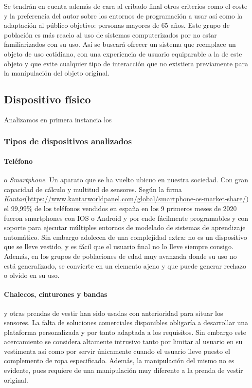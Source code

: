 Se tendrán en cuenta además de cara al cribado final otros criterios como el coste y la preferencia del autor sobre los entornos de programación a usar así como la adaptación al público objetivo: personas mayores de 65 años. Este grupo de población es más reacio al uso de sistemas computerizados por no estar familiarizados con su uso. Así se buscará ofrecer un sistema que reemplace un objeto de uso cotidiano, con una experiencia de usuario equiparable a la de este objeto y que evite cualquier tipo de interacción que no existiera previamente para la manipulación del objeto original.

\subsection{Dispositivo físico}\label{sub:req:hardware}

Analizamos en primera instancia los

\subsubsection{Tipos de dispositivos analizados}

\paragraph{Teléfono} o \textit{Smartphone}. Un aparato que se ha vuelto ubicuo en nuestra sociedad. Con gran capacidad de cálculo y multitud de sensores. Según la firma \textit{Kantar}(\url{https://www.kantarworldpanel.com/global/smartphone-os-market-share/}) el 99,99\% de los teléfonos vendidos en españa en los 9 primeros meses de 2020 fueron smartphones con IOS o Android y por ende fácilmente programables y con soporte para ejecutar múltiples entornos de modelado de sistemas de aprendizaje automático. Sin embargo adolecen de una complejidad extra: no es un dispositivo que se lleve vestido, y es fácil que el usuario final no lo lleve siempre consigo. Además, en los grupos de poblaciones de edad muy avanzada donde su uso no está generalizado, se convierte en un elemento ajeno y que puede generar rechazo o olvido en su uso.

\paragraph{Chalecos, cinturones y bandas} y otras prendas de vestir han sido usadas con anterioridad \cite{Liu2020, MobiFall} para situar los sensores. La falta de soluciones comerciales disponibles obligaría a desarrollar una plataforma personalizada y por tanto adaptada a los requisitos. Sin embargo este acercamiento se considera altamente intrusivo tanto por limitar al usuario en su vestimenta así como por servir únicamente cuando el usuario lleve puesto el complemento de ropa especificado. Además, la manipulación del mismo no es evidente, pues requiere de una manipulación muy diferente a la prenda de vestir original.


